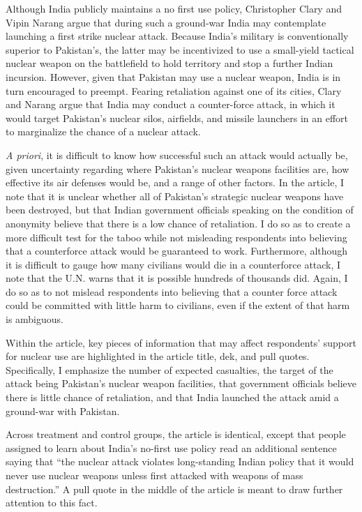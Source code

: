 \documentclass[12pt]{article}
\begin{document}
Although India publicly maintains a no first use policy, Christopher Clary and Vipin Narang argue that during such a ground-war India may contemplate launching a first strike nuclear attack. Because India's military is conventionally superior to Pakistan's, the latter may be incentivized to use a small-yield tactical nuclear weapon on the battlefield to hold territory and stop a further Indian incursion. However, given that Pakistan may use a nuclear weapon, India is in turn encouraged to preempt. Fearing retaliation against one of its cities, Clary and Narang argue that India may conduct a counter-force attack, in which it would target Pakistan's nuclear silos, airfields, and missile launchers in an effort to marginalize the chance of a nuclear attack. 

\textit{A priori}, it is difficult to know how successful such an attack would actually be, given uncertainty regarding where Pakistan's nuclear weapons facilities are, how effective its air defenses would be, and a range of other factors. In the article, I note that it is unclear whether all of Pakistan's strategic nuclear weapons have been destroyed, but that Indian government officials speaking on the condition of anonymity believe that there is a low chance of retaliation. I do so as to create a more difficult test for the taboo while not misleading respondents into believing that a counterforce attack would be guaranteed to work. Furthermore, although it is difficult to gauge how many civilians would die in a counterforce attack, I note that the U.N. warns that it is possible hundreds of thousands did. Again, I do so as to not mislead respondents into believing that a counter force attack could be committed with little harm to civilians, even if the extent of that harm is ambiguous.

Within the article, key pieces of information that may affect respondents' support for nuclear use are highlighted in the article title, dek, and pull quotes. Specifically, I emphasize the number of expected casualties, the target of the attack being Pakistan's nuclear weapon facilities, that government officials believe there is little chance of retaliation, and that India launched the attack amid a ground-war with Pakistan.

Across treatment and control groups, the article is identical, except that people assigned to learn about India's no-first use policy read an additional sentence saying that ``the nuclear attack violates long-standing Indian policy that it would never use nuclear weapons unless first attacked with weapons of mass destruction.'' A pull quote in the middle of the article is meant to draw further attention to this fact.
\end{document}
